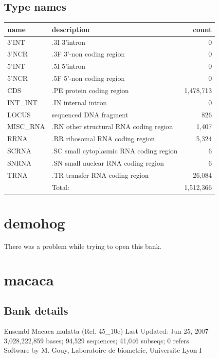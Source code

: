 \documentclass{article}
\begin{document}
\begin{Schunk}
\subsection{Type names}
\noindent\begin{tabular}{llr}
\hline \hline
name & description & count \\
\hline
3'INT  &  .3I 3'intron  &  0 \\
3'NCR  &  .3F  3'-non coding region  &  0 \\
5'INT  &  .5I 5'intron  &  0 \\
5'NCR  &  .5F  5'-non coding region  &  0 \\
CDS  &  .PE protein coding region  &  1,478,713 \\
INT\_INT  &  .IN  internal intron  &  0 \\
LOCUS  &  sequenced DNA fragment  &  826 \\
MISC\_RNA  &  .RN other structural RNA coding region  &  1,407 \\
RRNA  &  .RR ribosomal RNA coding region  &  5,324 \\
SCRNA  &  .SC small cytoplasmic RNA coding region  &  6 \\
SNRNA  &  .SN small nuclear RNA coding region  &  6 \\
TRNA  &  .TR transfer RNA coding region  &  26,084 \\
\hline
 & Total: & 1,512,366 \\
\hline \hline
\end{tabular}

\section{ demohog }
There was a problem while trying to open this bank.
\section{ macaca }
\subsection{Bank details}
Ensembl Macaca mulatta (Rel. 45\_10e) Last Updated: Jun 25, 2007\\
3,028,222,859 bases; 94,529 sequences; 41,046 subseqs; 0 refers.\\
Software by M. Gouy, Laboratoire de biometrie, Universite Lyon I


\end{Schunk}
\end{document}
